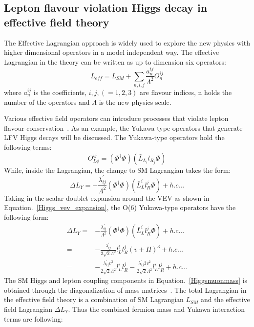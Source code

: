 \subsection{Lepton flavour violation Higgs decay in effective field theory}\label{effective_field}
The Effective Lagrangian approach is widely used to explore the new physics with higher dimensional operators in a model independent way. The effective Lagrangian in the theory can be written as up to dimension six operators: 
\begin{equation}
L_{eff}=L_{SM}+\sum_{n,i,j}\frac{a^{ij}_{n}}{\Lambda^{2}}O^{ij}_{n}
\end{equation}
where $a^{ij}_{n}$ is the coefficients, $i,j,(=1,2,3)$ are flavour indices, n holds the number of the operators and $\Lambda$ is the new physics scale. 

Various effective field operators can introduce processes that violate lepton flavour conservation~\cite{PhysRevD.62.116005}. As an example, the Yukawa-type operators that generate LFV Higgs decays will be discussed. The Yukawa-type operators hold the following terms:
\begin{equation}
O^{ij}_{L\phi}=(\Phi^{\dagger}\Phi)(\bar{L}_{L_{i}}l_{R_{j}}\Phi)
\end{equation}
While, inside the Lagrangian, the change to SM Lagrangian takes the form:
\begin{equation}
\Delta L_{Y}=-\frac{\lambda^{'}_{ij}}{\Lambda^{2}}(\Phi^{\dagger}\Phi)(\bar{L}^{i}_{L}l^{j}_{R}\Phi)+h.c...
\end{equation}
Taking in the scalar doublet expansion around the VEV as shown in Equation.~\ref{Higgs_vev_expansion}, the O(6) Yukawa-type operators have the following form:
\begin{equation}
\begin{aligned}
\Delta L_{Y}=&-\frac{\lambda^{'}_{ij}}{\Lambda^{2}}(\Phi^{\dagger}\Phi)(\bar{L}^{i}_{L}l^{j}_{R}\Phi)+h.c...\\
         =&-\frac{\lambda^{'}_{ij}}{2\sqrt{2}\Lambda^{2}}l_{L}^{i}l_{R}^{j}(v+H)^{3}+h.c...\\
         =&-\frac{\lambda^{'}_{ij}v^{3}}{2\sqrt{2}\Lambda^{2}}l_{L}^{i}l_{R}^{j}-\frac{\lambda^{'}_{ij}3v^{2}}{2\sqrt{2}\Lambda^{2}}l_{L}^{i}l_{R}^{j}+h.c...
\end{aligned}
\end{equation}
The SM Higgs and lepton coupling components in Equation.~\ref{Higgsmuonmass} is obtained through the diagonalization of mass matrices~\cite{Harnik:2012pb}. The total Lagrangian in the effective field theory is a combination of SM Lagrangian $L_{SM}$ and the effective field Lagrangian $\Delta L_{Y}$. Thus the combined fermion mass and Yukawa interaction terms are following:
